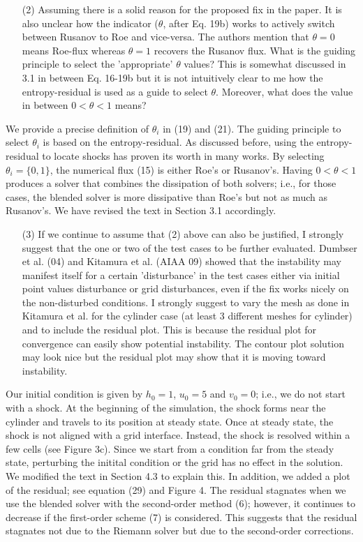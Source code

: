 \documentclass[english,11pt]{article}
\begin{document}
\bigskip
{\color{red}
  \begin{itemize}
  \item[(2)]
    Assuming there is a solid reason for the proposed fix in the paper. It is also unclear how the indicator
    ($\theta$, after Eq. 19b) works to actively switch between Rusanov to Roe and vice-versa. The authors
    mention that $\theta=0$ means Roe-flux whereas $\theta=1$ recovers the Rusanov flux. What is the guiding
    principle to select the 'appropriate' $\theta$ values? This is somewhat discussed in 3.1 in between Eq. 
    16-19b but it is not intuitively clear to me how the entropy-residual is used as a guide to select $\theta$.
    Moreover, what does the value in between $0<\theta<1$ means?
  \end{itemize}
}
\noindent
We provide a precise definition of $\theta_i$ in (19) and (21). The guiding principle to select $\theta_i$
is based on the entropy-residual. As discussed before, using the entropy-residual to locate shocks has proven
its worth in many works. 
By selecting $\theta_i=\{0,1\}$, the numerical flux (15) is either Roe's or Rusanov's.
Having $0<\theta<1$ produces a solver that combines the dissipation of both solvers; i.e.,
for those cases, the blended solver is more dissipative than Roe's but not as much as Rusanov's. 
We have revised the text in Section 3.1 accordingly. 

\bigskip
{\color{red}
  \begin{itemize}
  \item[(3)]
    If we continue to assume that (2) above can also be justified, I strongly suggest that the one or two of
    the test cases to be further evaluated. Dumbser et al. (04) and Kitamura et al. (AIAA 09) showed that the
    instability may manifest itself for a certain 'disturbance' in the test cases either via initial point values
    disturbance or grid disturbances, even if the fix works nicely on the non-disturbed conditions. I strongly
    suggest to vary the mesh as done in Kitamura et al. for the cylinder case (at least 3 different meshes for
    cylinder) and to include the residual plot. This is because the residual plot for convergence can easily show
    potential instability. The contour plot solution may look nice but the residual plot may show that it is
    moving toward instability.
  \end{itemize}
}
\noindent
Our initial condition is given by $h_0=1$, $u_0=5$ and $v_0=0$; i.e., we do not start with a shock. 
At the beginning of the simulation, the shock forms near the cylinder and travels to its position at 
steady state. Once at steady state, the shock is not aligned with a grid interface. Instead, the 
shock is resolved within a few cells (see Figure 3c). 
Since we start from a condition far from the steady state, 
perturbing the initital condition or the grid has no effect in the solution. We modified the text in
Section 4.3 to explain this. In addition, we added a plot of the residual; see equation (29) and 
Figure 4. 
The residual stagnates when we use the blended solver with the second-order method (6); however, it 
continues to decrease if the first-order scheme (7) is considered. This suggests that the residual stagnates 
not due to the Riemann solver but due to the second-order corrections. 
\end{document}

